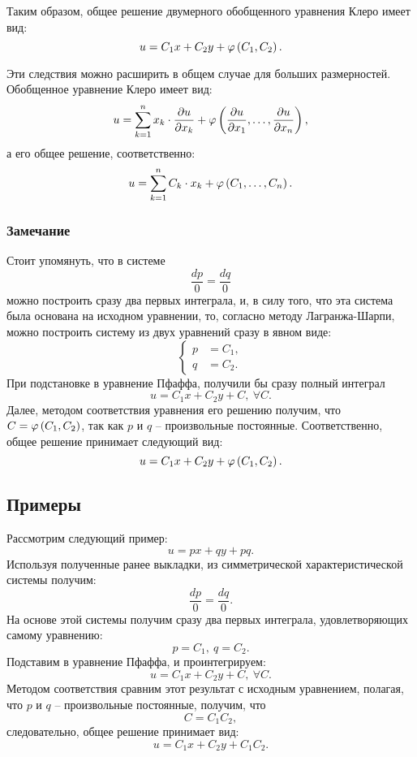 	Таким образом, общее решение двумерного обобщенного уравнения Клеро имеет вид:
	\[ u = C_1 x + C_2 y + \varphi \left( C_1, C_2 \right). \]

	Эти следствия можно расширить в общем случае для больших размерностей. Обобщенное уравнение Клеро имеет вид:
	\[ u = \sum_{k = 1}^{n} x_k \cdot \dfrac{\partial u}{\partial x_k} + \varphi \left( \dfrac{\partial u}{\partial x_1}, \dots, \dfrac{\partial u}{\partial x_n} \right), \]
	а его общее решение, соответственно:
	\[ u = \sum_{k = 1}^{n} C_k \cdot x_k + \varphi \left( C_1, \dots, C_n \right). \]

	\subsubsection*{Замечание}
		Стоит упомянуть, что в системе
		\[ \frac{dp}{0} = \frac{dq}{0} \]
		можно построить сразу два первых интеграла, и, в силу того, что эта система была основана на исходном уравнении, то, согласно методу Лагранжа-Шарпи, можно построить систему из двух уравнений сразу в явном виде:
		\[ \left\lbrace \begin{split} p &= C_1, \\ q &= C_2. \end{split} \right. \]
		При подстановке в уравнение Пфаффа, получили бы сразу полный интеграл
		\[ u = C_1 x + C_2 y + C, ~ \forall C. \]
		Далее, методом соответствия уравнения его решению получим, что $C = \varphi \left( C_1, C_2 \right)$, так как $p$ и $q$ -- произвольные постоянные. Соответственно, общее решение принимает следующий вид:
		\[ u = C_1 x + C_2 y + \varphi \left( C_1, C_2 \right). \]


	\subsection{Примеры}

		Рассмотрим следующий пример:
		\[ u = px + qy + pq. \]
		Используя полученные ранее выкладки, из симметрической характеристической системы получим:
		\[ \frac{dp}{0} = \frac{dq}{0}. \]
		На основе этой системы получим сразу два первых интеграла, удовлетворяющих самому уравнению:
		\[ p = C_1, ~ q = C_2. \]
		Подставим в уравнение Пфаффа, и проинтегрируем:
		\[ u = C_1 x + C_2 y + C, ~ \forall C. \]
		Методом соответствия сравним этот результат с исходным уравнением, полагая, что $p$ и $q$ -- произвольные постоянные, получим, что
		\[ C = C_1 C_2, \]
		следовательно, общее решение принимает вид:
		\[ u = C_1 x + C_2 y + C_1 C_2. \]

		\vspace{30pt}

